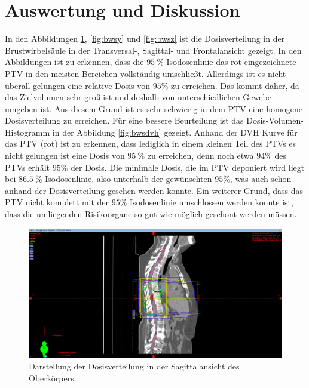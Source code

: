 \section{Auswertung und Diskussion}
In den Abbildungen \ref{fig:bwsx}, \ref{fig:bwsy} und \ref{fig:bwsz} ist die Dosisverteilung in der
Brustwirbelsäule in der Transversal-, Sagittal- und Frontalansicht gezeigt. In den Abbildungen ist zu erkennen, dass die $\SI{95}{\percent}$
Isodosenlinie das rot eingezeichnete PTV in den meisten Bereichen vollständig umschließt. Allerdings ist es nicht überall gelungen eine relative Dosis von
$95\%$ zu erreichen. Das kommt daher, da das Zielvolumen sehr groß ist und deshalb von unterschiedlichen Gewebe umgeben ist.
Aus diesem Grund ist es sehr schwierig in dem PTV eine homogene Dosisverteilung zu erreichen. Für eine bessere Beurteilung ist das
Dosis-Volumen-Histogramm in der Abbildung \ref{fig:bwsdvh} gezeigt. Anhand der DVH Kurve für das PTV (rot) ist zu erkennen, dass
lediglich in einem kleinen Teil des PTVs es nicht gelungen ist eine Dosis von $\SI{95}{\percent}$ zu erreichen, denn
noch etwa $94\%$ des PTVs erhält $95\%$ der Dosis.
Die minimale Dosis, die im PTV deponiert wird liegt bei  $\SI{86.5}{\percent}$ Isodosenlinie, also unterhalb der gewünschten $95\%$, was auch schon
anhand der Dosisverteilung gesehen werden konnte.
Ein weiterer Grund, dass das PTV nicht komplett mit der $95\%$ Isodosenlinie umschlossen werden konnte ist, dass
die umliegenden Risikoorgane so gut wie möglich geschont werden müssen.

\begin{figure}[H]
	\centering
	\includegraphics[width=\linewidth]{Bilder/BWS_X}
	\caption{Darstellung der Dosisverteilung in der Sagittalansicht des Oberkörpers.}
	\label{fig:bwsx}
\end{figure}

